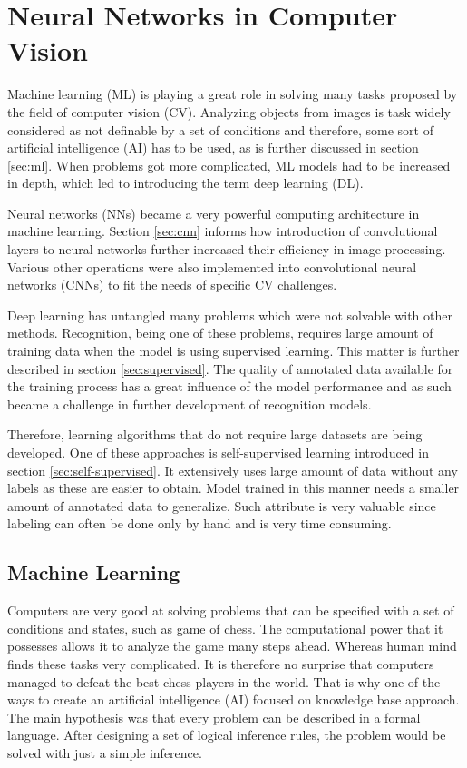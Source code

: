 \chapter{\label{chap:nn-in-cv}Neural Networks in Computer Vision}

Machine learning (ML) is playing a great role in solving many tasks proposed by the field of computer vision (CV). Analyzing objects from images is task widely considered as not definable by a set of conditions and therefore, some sort of artificial intelligence (AI) has to be used, as is further discussed in section \ref{sec:ml}. When problems got more complicated, ML models had to be increased in depth, which led to introducing the term deep learning (DL). 

Neural networks (NNs) became a very powerful computing architecture in machine learning. Section \ref{sec:cnn} informs how introduction of convolutional layers to neural networks further increased their efficiency in image processing. Various other operations were also implemented into convolutional neural networks (CNNs) to fit the needs of specific CV challenges.

Deep learning has untangled many problems which were not solvable with other methods. Recognition, being one of these problems, requires large amount of training data when the model is using supervised learning. This matter is further described in section \ref{sec:supervised}. The quality of annotated data  available for the training process has a great influence of the model performance and as such became a challenge in further development of recognition models.

Therefore, learning algorithms that do not require large datasets are being developed. One of these approaches is self-supervised learning introduced in section \ref{sec:self-supervised}. It extensively uses large amount of data without any labels as these are easier to obtain. Model trained in this manner needs a smaller amount of annotated data to generalize. Such attribute is very valuable since labeling can often be done only by hand and is very time consuming.

\section{\label{sec:ml}Machine Learning}

Computers are very good at solving problems that can be specified with a set of conditions and states, such as game of chess. The computational power that it possesses allows it to analyze the game many steps ahead. Whereas human mind finds these tasks very complicated. It is therefore no surprise that computers managed to defeat the best chess players in the world. That is why one of the ways to create an artificial intelligence (AI) focused on knowledge base approach. The main hypothesis was that every problem can be described in a formal language. After designing a set of logical inference rules, the problem would be solved with just a simple inference.


